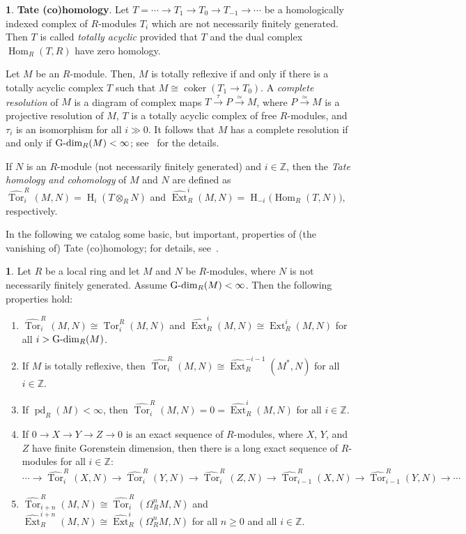 \documentclass[11pt]{amsart}
\theoremstyle{definition}
\theoremstyle{definition}
\newtheorem{chunk}[thm]{\hspace*{-1.065ex}\bf}
\numberwithin{equation}{section}
\newcommand{\ZZ}{\mathbb{Z}}
\DeclareMathOperator{\Gdim}{\textnormal{G-dim}}
\DeclareMathOperator{\coker}{coker}
\DeclareMathOperator{\Ext}{Ext}
\DeclareMathOperator{\hh}{H}
\DeclareMathOperator{\Hom}{Hom}
\DeclareMathOperator{\pd}{pd}
\DeclareMathOperator{\Tor}{Tor}
\begin{document}

\begin{chunk} {\bf Tate (co)homology}. \label{Tate} Let $T=\cdots\to  T_1 \to T_0 \to T_{-1} \to \cdots$ be a homologically indexed complex of $R$-modules $T_i$ which are not necessarily finitely generated. Then $T$ is called \emph{totally acyclic} provided that $T$ and the dual complex $\Hom_R(T,R)$ have zero homology. 

Let $M$ be an $R$-module. Then, $M$ is totally reflexive if and only if there is a totally acyclic complex $T$ such that $M\cong\coker(T_1\to T_0)$. A \emph{complete resolution} of $M$ is a diagram of complex maps $T\overset{\tau}{\to}P\overset{\simeq}{\to} M$, where $P\overset{\simeq}{\to}M$ is a projective resolution of $M$, $T$ is a totally acyclic complex of free $R$-modules, and $\tau_i$ is an isomorphism for all $i\gg 0$.  It follows that $M$ has a complete resolution if and only if $\Gdim_R(M)<\infty$; see~\cite{AM} for the details.

If $N$ is an $R$-module (not necessarily finitely generated) and $i\in\ZZ$, then the \emph{Tate homology and cohomology} of $M$ and $N$ are defined as $\widehat{\Tor}^R_i(M,N)=\hh_i(T\otimes_RN)$ and $\widehat{\Ext}^i_R(M,N)=\hh_{-i}\big(\Hom_R(T,N)\big)$, respectively. 
\end{chunk}

In the following we catalog some basic, but important, properties of (the vanishing of) Tate (co)homology; for details, see~\cite{AvBu,AM,CJ}.

\begin{chunk}\label{Tate hom} \label{Tate2} Let $R$ be a local ring and let $M$ and $N$ be $R$-modules, where $N$ is not necessarily finitely generated. Assume $\Gdim_R(M)<\infty$. Then the following properties hold:
\begin{enumerate}[\rm(i)]	
\item $\widehat{\Tor}^R_i(M,N)\cong\Tor_i^R(M,N)$ and $\widehat{\Ext}^i_R(M,N)\cong\Ext^i_R(M,N)$ for all $i>\Gdim_R(M)$.
\item If $M$ is totally reflexive, then $\widehat{\Tor}_i^R(M,N)\cong\widehat{\Ext}^{-i-1}_R(M^*,N)$ for all $i\in\ZZ$.
\item If $\pd_R(M)<\infty$, then $\widehat{\Tor}_i^R(M,N)=0=\widehat{\Ext}^i_R(M,N)$ for all $i\in\ZZ$.
\item If $0 \to X \to Y \to Z \to 0$ is an exact sequence of $R$-modules, where $X$, $Y$, and $Z$ have finite Gorenstein dimension, then there is a long exact sequence of $R$-modules for all $i\in \ZZ$:\\
$\cdots \to \widehat{\Tor}^R_{i}(X,N) \to \widehat{\Tor}^R_{i}(Y,N) \to \widehat{\Tor}^R_{i}(Z,N) \to \widehat{\Tor}^R_{i-1}(X,N) \to  \widehat{\Tor}^R_{i-1}(Y,N) \to  \cdots$
\item $\widehat{\Tor}^R_{i+n}(M,N)\cong\widehat{\Tor}^R_i(\Omega_R^n M,N)$ and $\widehat{\Ext}^{i+n}_R(M,N)\cong\widehat{\Ext}^i_R(\Omega_R^n M,N)$ for all $n\geq0$ and all $i\in\ZZ$. 
\end{enumerate}	
\end{chunk}
\end{document}
